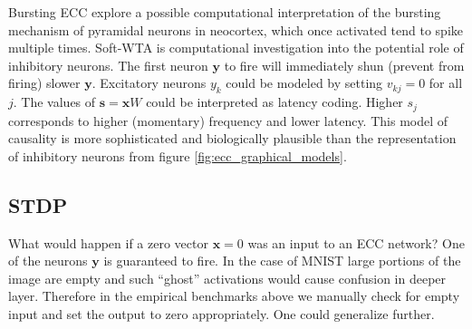 \documentclass[oneside,english,logo]{amuthesis}
\DeclareMathOperator*{\argmax}{argmax}
\begin{document}

Bursting ECC explore a possible computational interpretation of the bursting mechanism of pyramidal neurons in neocortex, which once activated tend to spike multiple times. 
Soft-WTA is computational investigation into the potential role of inhibitory neurons. The first neuron $\boldsymbol{y}$ to fire will immediately shun (prevent from firing) slower  $\boldsymbol{y}$. Excitatory neurons $y_k$ could be modeled by setting $v_{kj}=0$ for all $j$.  The values of $\boldsymbol{s}=\boldsymbol{x} W$ could be interpreted as latency coding. Higher $s_j$ corresponds to higher (momentary) frequency and lower latency. This model of causality is more sophisticated and biologically plausible than the representation of inhibitory neurons from figure \ref{fig:ecc_graphical_models}.


\subsection{STDP}
\iffalse
What would happen if a zero vector $\boldsymbol{x}=0$ was an input to an ECC network? One of the neurons $\boldsymbol{y}$ is guaranteed to fire. In the case of MNIST large portions of the image are empty and such ``ghost'' activations would cause confusion in deeper layer. Therefore in the empirical benchmarks above we manually check for empty input and set the output to zero appropriately. One could generalize further.
\end{document}
